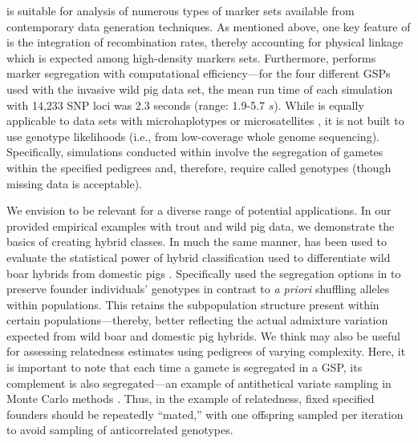 {\gscramble{} is suitable for analysis of numerous types of marker sets available from contemporary data generation 
techniques. As mentioned above, 
one key feature of \gscramble{} is the integration of recombination rates, thereby accounting for physical 
linkage which is expected among high-density markers sets. Furthermore, \gscramble{} performs marker 
segregation with computational efficiency---for the four different GSPs used with the invasive wild pig data set, 
the mean run time of each simulation with 14,233 SNP loci was 2.3 seconds (range: 1.9-5.7 $s$). 
While \gscramble{} is equally applicable to data sets with 
microhaplotypes \citep{baetscher2018microhaplotypes} or microsatellites \citep{zhan2017megasat}, 
it is not built to use genotype likelihoods (i.e., from low-coverage whole genome sequencing). 
Specifically, simulations conducted within \gscramble{} involve the segregation of gametes within the 
specified pedigrees and, therefore, require called genotypes (though missing data is acceptable). 

We envision \gscramble{} to be relevant for a diverse range of potential applications. In our 
provided empirical examples with trout and wild pig data, we demonstrate the basics of 
creating hybrid classes. In much the same manner, \gscramble{} has been used to evaluate the statistical power 
of hybrid classification used to differentiate wild boar hybrids from domestic pigs 
\citep{smyser2024probgen}. Specifically \citet{smyser2024probgen} used the segregation options in \gscramble{} 
 to preserve founder individuals' genotypes in contrast to \textit{a priori} shuffling alleles 
within populations. This retains the subpopulation structure present within certain populations---thereby, better reflecting the 
actual admixture variation expected from wild boar and domestic pig hybrids. We think \gscramble{} 
may also be useful for assessing relatedness estimates using pedigrees of varying complexity. Here, it 
is important to note that each time a gamete is segregated in a GSP, its complement is also 
segregated---an example of antithetical variate sampling in Monte Carlo methods \citep{hammersley}.
Thus, in the  example of relatedness, fixed specified founders should be repeatedly ``mated,'' with one offspring 
sampled per iteration to avoid sampling of anticorrelated genotypes.


}
